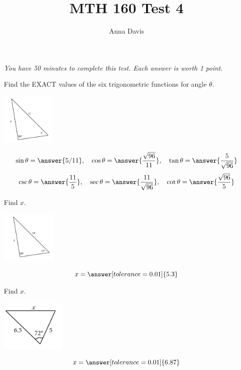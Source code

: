 \documentclass{ximera}
\author{Anna Davis} \title{MTH 160 Test 4}
\begin{document}
\begin{abstract}

\end{abstract}
\maketitle
 \textit{You have 50 minutes to complete this test.  Each answer is worth 1 point.}
 \begin{problem}\label{prob:160test4prob1}
 Find the EXACT values of the six trigonometric functions for angle $\theta$. 
 
 \begin{image}
   
\includegraphics[height=1in]{test4diagram1.jpg}

\end{image}

$$\sin\theta=\answer{5/11},\quad \cos\theta=\answer{\frac{\sqrt{96}}{11}},\quad\tan\theta=\answer{\frac{5}{\sqrt{96}}}$$
$$\csc\theta=\answer{\frac{11}{5}},\quad\sec\theta=\answer{\frac{11}{\sqrt{96}}},\quad\cot\theta=\answer{\frac{\sqrt{96}}{5}}$$

\end{problem}

\begin{problem}\label{prob:160test4prob2}
 Find $x$.  
 
 \begin{image}
   
\includegraphics[height=1in]{test4diagram2.jpg}

\end{image}
$$x=\answer[tolerance=0.01]{5.3}$$

\end{problem}

\begin{problem}\label{prob:160test4prob3}
 Find $x$. 
 
 \begin{image}
   
\includegraphics[height=1in]{test4diagram3.jpg}

\end{image}
$$x=\answer[tolerance=0.01]{6.87}$$
\end{problem}
\end{document}
